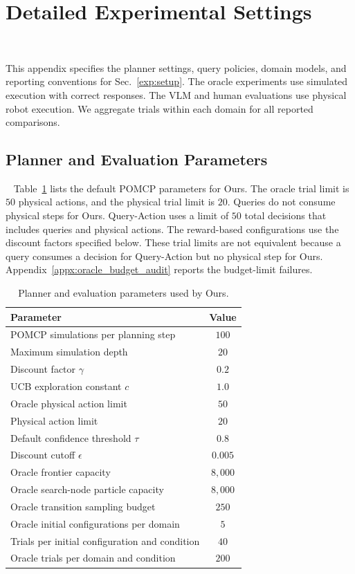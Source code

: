 \section{Detailed Experimental Settings}~\label{appx:settings}

This appendix specifies the planner settings, query policies, domain models, and reporting conventions for Sec.~\ref{exp:setup}. The oracle experiments use simulated execution with correct responses. The VLM and human evaluations use physical robot execution. We aggregate trials within each domain for all reported comparisons.

\subsection{Planner and Evaluation Parameters}~\label{appx:planner_params}
Table~\ref{tab:app_planner_params} lists the default POMCP parameters for Ours. The oracle trial limit is $50$ physical actions, and the physical trial limit is $20$. Queries do not consume physical steps for Ours. Query-Action uses a limit of $50$ total decisions that includes queries and physical actions. The reward-based configurations use the discount factors specified below. These trial limits are not equivalent because a query consumes a decision for Query-Action but no physical step for Ours. Appendix~\ref{appx:oracle_budget_audit} reports the budget-limit failures.

\begin{table}[!htbp]
\centering
\caption{Planner and evaluation parameters used by Ours.}
\label{tab:app_planner_params}
\small
\begin{tabular}{lc}
\toprule
\textbf{Parameter} & \textbf{Value} \\
\midrule
POMCP simulations per planning step & $100$ \\
Maximum simulation depth & $20$ \\
Discount factor $\gamma$ & $0.2$ \\
UCB exploration constant $c$ & $1.0$ \\
Oracle physical action limit & $50$ \\
Physical action limit & $20$ \\
Default confidence threshold $\tau$ & $0.8$ \\
Discount cutoff $\epsilon$ & $0.005$ \\
Oracle frontier capacity & $8{,}000$ \\
Oracle search-node particle capacity & $8{,}000$ \\
Oracle transition sampling budget & $250$ \\
Oracle initial configurations per domain & $5$ \\
Trials per initial configuration and condition & $40$ \\
Oracle trials per domain and condition & $200$ \\
\bottomrule
\end{tabular}
\end{table}

